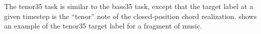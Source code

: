 
The \gls{tenor35} task is similar to the \gls{bass35} task,
except that the target label at a given timestep is the
``tenor'' note of the \gls{closed-position} chord
realization.  shows an example
of the \gls{tenor35} target label for a fragment of music.

